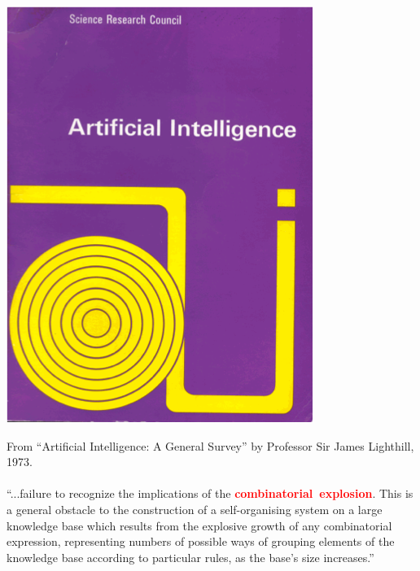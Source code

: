 \documentclass[landscape,a0b]{a0poster_csml_v2}
\begin{document}
\begin{poster}
\begin{PosterColumn}
\vspace{-2cm}
\begin{center}
\end{center}
\vspace{0.5cm}
\begin{minipage}[hc]{0.19\textwidth}
  \centering
  \includegraphics[width=0.95\linewidth]{imgs/book.png}
  \\
\end{minipage}
\hfill
\begin{minipage}[hc]{0.8\textwidth}
  From ``Artificial Intelligence: A General Survey'' by Professor Sir James Lighthill, 1973. \\
  \vspace{0.5cm}
  \\
  ``...failure to recognize the implications of the {\bf \textcolor{red}{combinatorial~explosion}}. This is a general obstacle to the construction of a self-organising system on a large knowledge base which results from the explosive growth of any combinatorial expression, representing numbers of possible ways of grouping elements of the knowledge base according to particular rules, as the base's size increases.''
\end{minipage}


\end{PosterColumn}
\end{poster}
\end{document}
